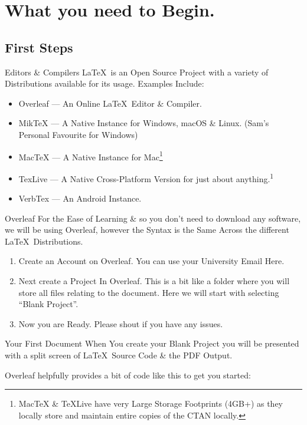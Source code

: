 \documentclass{beamer}
\begin{document}
\section{What you need to Begin.}
\subsection{First Steps}
\begin{frame}{Editors \& Compilers}
\LaTeX~is an Open Source Project with a variety of Distributions available for its usage. Examples Include:\\
\begin{itemize}

\item Overleaf --- An Online \LaTeX~Editor \& Compiler.
\item MikTeX --- A Native Instance for Windows, macOS \& Linux. (Sam's Personal Favourite for Windows)
\item MacTeX --- A Native Instance for Mac\footnote{MacTeX \& TeXLive have  very Large Storage Footprints (4GB+) as they locally store and maintain entire copies of the CTAN locally.{\label{fn1}}}
\item TexLive --- A Native Cross-Platform Version for just about anything.\textsuperscript{1}
\item VerbTex --- An Android Instance.

\end{itemize}
\end{frame}

\begin{frame}{Overleaf}
For the Ease of Learning \& so you don't need to download any software, we will be using Overleaf, however the Syntax is the Same Across the different \LaTeX~Distributions.
\begin{enumerate}
\item Create an Account on Overleaf. You can use your University Email Here.
\item Next create a Project In Overleaf. This is a bit like a folder where you will store all files relating to the document. Here we will start with selecting ``Blank Project''.
\item Now you are Ready. Please shout if you have any issues.
\end{enumerate}
\end{frame}


\begin{frame}{Your First Document}
When You create your Blank Project you will be presented with a split screen of \LaTeX~Source Code \& the PDF Output.\par Overleaf helpfully provides a bit of code like this to get you started:\\

\end{frame}
\end{document}
